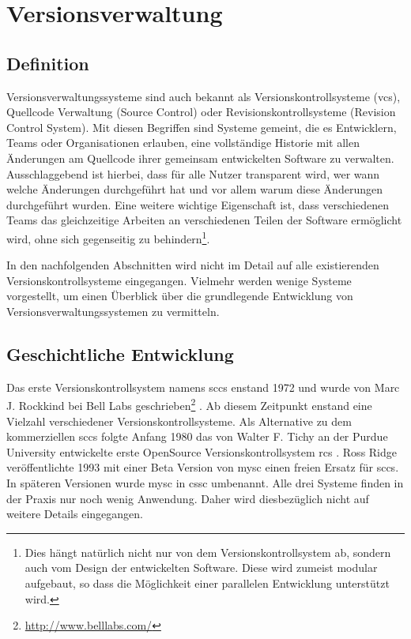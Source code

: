 \chapter{Versionsverwaltung}\label{cha:Versionsverwaltung}
\section{Definition}\label{sec:Definition}
Versionsverwaltungssysteme sind auch bekannt als Versionskontrollsysteme
(\acrlong{vcs}), Quellcode Verwaltung (Source Control) oder
Revisionskontrollsysteme (Revision Control System). Mit diesen Begriffen sind
Systeme gemeint, die es Entwicklern, Teams oder Organisationen erlauben, eine
vollständige Historie mit allen Änderungen am Quellcode ihrer gemeinsam
entwickelten Software zu verwalten. Ausschlaggebend ist hierbei, dass für alle
Nutzer transparent wird, wer wann welche Änderungen durchgeführt hat und vor
allem warum diese Änderungen durchgeführt wurden. Eine weitere wichtige
Eigenschaft ist, dass verschiedenen Teams das gleichzeitige Arbeiten an
verschiedenen Teilen der Software ermöglicht wird, ohne sich gegenseitig zu
behindern\footnote{Dies hängt natürlich nicht nur von dem
Versionskontrollsystem ab, sondern auch vom Design der entwickelten Software.
Diese wird zumeist modular aufgebaut, so dass die Möglichkeit einer parallelen
Entwicklung unterstützt wird.}. \cite[S.~381]{cd}

In den nachfolgenden Abschnitten wird nicht im Detail auf alle existierenden
Versionskontrollsysteme eingegangen. Vielmehr werden wenige Systeme
vorgestellt, um einen Überblick über die grundlegende Entwicklung von
Versionsverwaltungssystemen zu vermitteln.

\section{Geschichtliche Entwicklung}\label{sec:GeschichtlicheEntwicklung}
Das erste Versionskontrollsystem namens \acrshort{sccs} enstand 1972 und wurde von Marc
J. Rockkind bei Bell Labs geschrieben\footnote{\url{http://www.belllabs.com/}}
\cite[S.~382]{cd}. Ab diesem Zeitpunkt enstand eine Vielzahl verschiedener
Versionskontrollsysteme. Als Alternative zu dem kommerziellen \acrshort{sccs}
folgte Anfang 1980 das von Walter F. Tichy an der Purdue University entwickelte
erste \gls{OpenSource} Versionskontrollsystem \acrfull{rcs}
\cite{paper:rcs,link:rcs}. Ross Ridge veröffentlichte 1993 mit einer Beta
Version von \acrshort{mysc} einen freien Ersatz für \acrshort{sccs}.  In
späteren Versionen wurde \acrshort{mysc} in \acrfull{cssc}
umbenannt\cite{link:cssc,link:mysc}. Alle drei Systeme finden in der Praxis nur
noch wenig Anwendung. Daher wird diesbezüglich nicht auf weitere Details
eingegangen.

